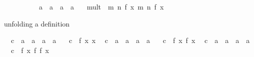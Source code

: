 \begin{isabellebody}
\ \ \ \ \ \ \ \ \ \ {\isacharparenleft}{\kern0pt}{\isacharprime}{\kern0pt}a\ {\isasymRightarrow}\ {\isacharprime}{\kern0pt}a{\isacharparenright}{\kern0pt}\ {\isasymRightarrow}\ {\isacharprime}{\kern0pt}a\ {\isasymRightarrow}\ {\isacharprime}{\kern0pt}a{\isachardoublequoteclose}\ \isanewline
\ \ {\isachardoublequoteopen}mult\ {\isasymequiv}\ {\isasymlambda}m\ n\ f\ x{\isachardot}{\kern0pt}\ m\ {\isacharparenleft}{\kern0pt}n\ f{\isacharparenright}{\kern0pt}\ x{\isachardoublequoteclose}%
\begin{isamarkuptext}%
unfolding a definition%
\end{isamarkuptext}\isamarkuptrue%
\isamarkupfalse%
\isanewline
\ \ c{\isacharunderscore}{\kern0pt}{}\ {\isacharcolon}{\kern0pt}{\isacharcolon}{\kern0pt}\ {\isachardoublequoteopen}{\isacharparenleft}{\kern0pt}{\isacharprime}{\kern0pt}a\ {\isasymRightarrow}\ {\isacharprime}{\kern0pt}a{\isacharparenright}{\kern0pt}\ {\isasymRightarrow}\ {\isacharprime}{\kern0pt}a\ {\isasymRightarrow}\ {\isacharprime}{\kern0pt}a{\isachardoublequoteclose}\ \isanewline
\ \ {\isachardoublequoteopen}c{\isacharunderscore}{\kern0pt}{}\ {\isasymequiv}\ {\isasymlambda}f\ x{\isachardot}{\kern0pt}\ x{\isachardoublequoteclose}\isanewline
\isanewline
{}\isamarkupfalse%
\isanewline
\ \ c{\isacharunderscore}{\kern0pt}{}\ {\isacharcolon}{\kern0pt}{\isacharcolon}{\kern0pt}\ {\isachardoublequoteopen}{\isacharparenleft}{\kern0pt}{\isacharprime}{\kern0pt}a\ {\isasymRightarrow}\ {\isacharprime}{\kern0pt}a{\isacharparenright}{\kern0pt}\ {\isasymRightarrow}\ {\isacharprime}{\kern0pt}a\ {\isasymRightarrow}\ {\isacharprime}{\kern0pt}a{\isachardoublequoteclose}\ \isanewline
\ \ {\isachardoublequoteopen}c{\isacharunderscore}{\kern0pt}{}\ {\isasymequiv}\ {\isasymlambda}f\ x{\isachardot}{\kern0pt}\ f\ x{\isachardoublequoteclose}\isanewline
\isanewline
{}\isamarkupfalse%
\isanewline
\ \ c{\isacharunderscore}{\kern0pt}{}\ {\isacharcolon}{\kern0pt}{\isacharcolon}{\kern0pt}\ {\isachardoublequoteopen}{\isacharparenleft}{\kern0pt}{\isacharprime}{\kern0pt}a\ {\isasymRightarrow}\ {\isacharprime}{\kern0pt}a{\isacharparenright}{\kern0pt}\ {\isasymRightarrow}\ {\isacharprime}{\kern0pt}a\ {\isasymRightarrow}\ {\isacharprime}{\kern0pt}a{\isachardoublequoteclose}\ \isanewline
\ \ {\isachardoublequoteopen}c{\isacharunderscore}{\kern0pt}{}\ {\isasymequiv}\ {\isasymlambda}f\ x{\isachardot}{\kern0pt}\ f\ {\isacharparenleft}{\kern0pt}f\ x{\isacharparenright}{\kern0pt}{\isachardoublequoteclose}\isanewline

\end{isabellebody}
